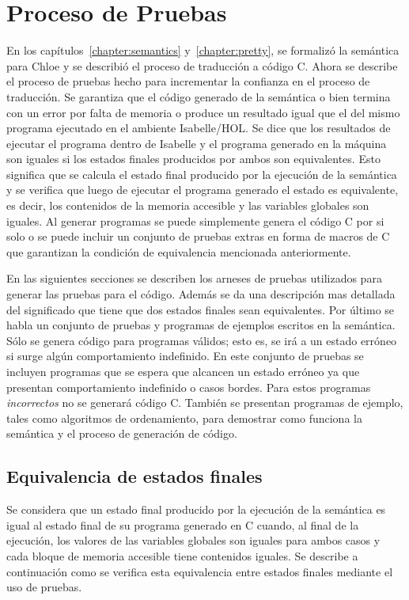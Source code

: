 \chapter{Proceso de Pruebas}\label{chapter:testing}

En los capítulos~\ref{chapter:semantics} y~\ref{chapter:pretty}, se formalizó la semántica para Chloe y se describió el proceso de traducción a código C.
Ahora se describe el proceso de pruebas hecho para incrementar la confianza en el proceso de traducción.
Se garantiza que el código generado de la semántica o bien termina con un error por falta de memoria o produce un resultado igual que el del mismo programa ejecutado en el ambiente Isabelle/HOL.
Se dice que los resultados de ejecutar el programa dentro de Isabelle y el programa generado en la máquina son iguales si los estados finales producidos por ambos son equivalentes.
Esto significa que se calcula el estado final producido por la ejecución de la semántica y se verifica que luego de ejecutar el programa generado el estado es equivalente, es decir, los contenidos de la memoria accesible y las variables globales son iguales.
Al generar programas se puede simplemente genera el código C por si solo o se puede incluir un conjunto de pruebas extras en forma de macros de C que garantizan la condición de equivalencia mencionada anteriormente.

En las siguientes secciones se describen los arneses de pruebas utilizados para generar las pruebas para el código.
Además se da una descripción mas detallada del significado que tiene que dos estados finales sean equivalentes.
Por último se habla un conjunto de pruebas y programas de ejemplos escritos en la semántica.
Sólo se genera código para programas válidos; esto es, se irá a un estado erróneo si surge algún comportamiento indefinido.
En este conjunto de pruebas se incluyen programas que se espera que alcancen un estado erróneo ya que presentan comportamiento indefinido o casos bordes.
Para estos programas \textit{incorrectos} no se generará código C.
También se presentan programas de ejemplo, tales como algoritmos de ordenamiento, para demostrar como funciona la semántica y el proceso de generación de código.


\section{Equivalencia de estados finales}

Se considera que un estado final producido por la ejecución de la semántica es igual al estado final de su programa generado en C cuando, al final de la ejecución, los valores de las variables globales son iguales para ambos casos y cada bloque de memoria accesible tiene contenidos iguales.
Se describe a continuación como se verifica esta equivalencia entre estados finales mediante el uso de pruebas.

